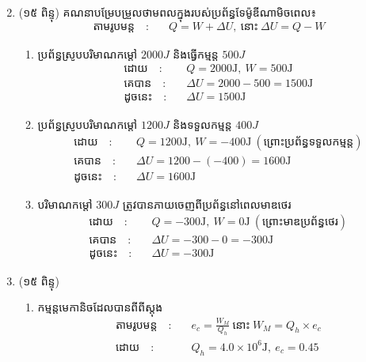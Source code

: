 \documentclass{classes/exam}
\begin{document}
\begin{enumerate}[I]
\begin{enumerate}[k]
\begin{itemize}
\begin{align*}
			\end{align*}
		\end{itemize}
	\end{enumerate}
	\item {\color{magenta}\ks (១៥ ពិន្ទុ)} គណនាបម្រែបម្រួលថាមពលក្នុងរបស់ប្រព័ន្ធទែម៉ូឌីណាមិចពេល៖
	\begin{align*}
		\text{តាមរូបមន្ត}\quad :&\quad Q=W+\Delta U,~\text{នោះ}~\Delta U=Q-W
	\end{align*}
	\begin{enumerate}[k]
		\item ប្រព័ន្ធស្រូបបរិមាណកម្តៅ $2000J$ និងធ្វើកម្មន្ត $500J$
			\begin{align*}
				\text{ដោយ}\quad :&\quad Q=2000\si{\joule},~W=500\si{\joule}\\
				\text{គេបាន}\quad :&\quad \Delta U=2000-500=1500\si{\joule}\\
				\text{ដូចនេះ}\quad :&\quad \Delta U=1500\si{\joule}
			\end{align*}
		\item ប្រព័ន្ធស្រូបបរិមាណកម្តៅ $1200J$ និងទទួលកម្មន្ត $400J$
			\begin{align*}
				\text{ដោយ}\quad :&\quad Q=1200\si{\joule},~W=-400\si{\joule}~(\text{ព្រោះប្រព័ន្ធទទួលកម្មន្ត})\\
				\text{គេបាន}\quad :&\quad \Delta U=1200-\left(-400\right)=1600\si{\joule}\\
				\text{ដូចនេះ}\quad :&\quad \Delta U=1600\si{\joule}
			\end{align*}
		\item បរិមាណកម្តៅ $300J$ ត្រូវបានភាយចេញពីប្រព័ន្ធនៅពេលមាឌថេរ
		\begin{align*}
			\text{ដោយ}\quad :&\quad Q=-300\si{\joule},~W=0\si{\joule}~(\text{ព្រោះមាឌប្រព័ន្ធថេរ})\\
			\text{គេបាន}\quad :&\quad \Delta U=-300-0=-300\si{\joule}\\
			\text{ដូចនេះ}\quad :&\quad \Delta U=-300\si{\joule}
		\end{align*}
	\end{enumerate}
	\item {\color{magenta}\ks (១៥ ពិន្ទុ)}
	\begin{enumerate}[k]
		\item កម្មន្តមេកានិចដែលបានពីពីស្តុង
			\begin{align*}
				\text{តាមរូបមន្ត}\quad:&\quad e_{c}=\frac{W_{M}}{Q_{h}}~\text{នោះ}~W_{M}=Q_{h}\times e_{c}\\
				\text{ដោយ}\quad :&\quad Q_{h}=4.0\times 10^{6}\si{\joule},~e_{c}=0.45\\

\end{align*}
\end{enumerate}
\end{enumerate}
\end{document}
